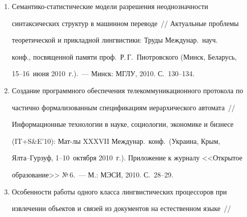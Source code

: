 \begin{enumerate}[1.]
Об одном подходе к выбору технических средств для построения 


телекоммуникационных сетей~/\!\!/  Информационные технологии в науке, 


социологии, экономике и бизнесе (IT\;+\;S\&E'10): Мат-лы XXXVII 


Междунар.\ конф.\ (Украина, Крым, Ялта--Гурзуф, 1--10~октября 2010~г.). 


Приложение к журналу <<Открытое образование>> №\,6.~--- М.: МЭСИ, 


2010. С.~154--156.


\item {}


Семантико-статистические модели разрешения неоднозначности 


синтаксических структур в машинном переводе~/\!\!/  Актуальные проб\-ле\-мы 


теоретической и прикладной лингвистики: Труды Междунар.\ науч.\ 


конф., посвященной памяти проф.\ Р.\,Г.~Пиотровского (Минск, Беларусь, 


15--16~июня 2010~г.).~--- Минск: МГЛУ, 2010. С.~130--134.


\item {}


Создание программного обеспечения телекоммуникационного протокола по 


частично формализованным спецификациям иерархического автомата~/\!\!/  


Информационные технологии в науке, социологии, экономике и бизнесе 


(IT\;+\;S\&E'10): Мат-лы XXXVII Междунар.\ конф.\ (Украина, Крым, 


Ялта--Гурзуф, 1--10~октября 2010~г.). Приложение к журналу <<Открытое 


образование>> №\,6.~--- М.: МЭСИ, 2010. С.~28--29.







\item {}


Особенности работы одного класса лингвистических процессоров при 


извлечении объектов и связей из документов на естественном языке~/\!\!/  



\end{enumerate}

